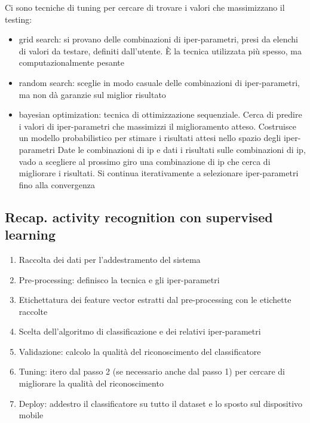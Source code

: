 Ci sono tecniche di tuning per cercare di trovare i valori che massimizzano il testing:
\begin{itemize}
    \item grid search: si provano delle combinazioni di iper-parametri, presi da elenchi di valori da testare, definiti dall'utente. È la tecnica utilizzata più spesso, ma computazionalmente pesante
    \item random search: sceglie in modo casuale delle combinazioni di iper-parametri, ma non dà garanzie sul miglior risultato
    \item bayesian optimization: tecnica di ottimizzazione sequenziale. Cerca di predire i valori di iper-parametri che massimizzi il miglioramento atteso. Costruisce un modello probabilistico per stimare i risultati attesi nello spazio degli iper-parametri
    Date le combinazioni di ip e dati i risultati sulle combinazioni di ip, vado a scegliere al prossimo giro una combinazione di ip che cerca di migliorare i risultati. Si continua iterativamente a selezionare iper-parametri fino alla convergenza
\end{itemize} 

\subsection{Recap. activity recognition con supervised learning}
\begin{enumerate}
    \item Raccolta dei dati per l'addestramento del sistema
    \item Pre-processing: definisco la tecnica e gli iper-parametri
    \item Etichettatura dei feature vector estratti dal pre-processing con le etichette raccolte
    \item Scelta dell'algoritmo di classificazione e dei relativi iper-parametri
    \item Validazione: calcolo la qualità del riconoscimento del classificatore
    \item Tuning: itero dal passo 2 (se necessario anche dal passo 1) per cercare di migliorare la qualità del riconoscimento
    \item Deploy: addestro il classificatore su tutto il dataset e lo sposto sul dispositivo mobile
\end{enumerate}

